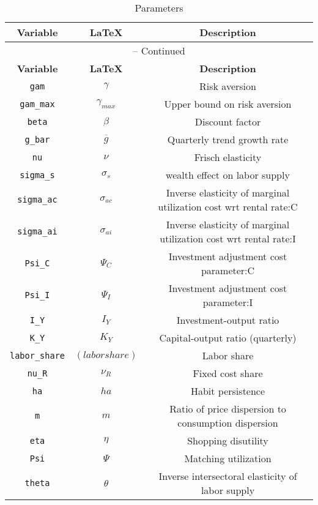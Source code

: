 \begin{center}
\begin{longtable}{ccc}
\caption{Parameters}\\%
\hline%
\multicolumn{1}{c}{\textbf{Variable}} &
\multicolumn{1}{c}{\textbf{\LaTeX}} &
\multicolumn{1}{c}{\textbf{Description}}\\%
\hline\hline%
\endfirsthead
\multicolumn{3}{c}{{\tablename} \thetable{} -- Continued}\\%
\hline%
\multicolumn{1}{c}{\textbf{Variable}} &
\multicolumn{1}{c}{\textbf{\LaTeX}} &
\multicolumn{1}{c}{\textbf{Description}}\\%
\hline\hline%
\endhead
\texttt{gam} & ${\gamma}$ & Risk aversion\\
\texttt{gam\_max} & ${\gamma_{max}}$ & Upper bound on risk aversion\\
\texttt{beta} & ${\beta}$ & Discount factor\\
\texttt{g\_bar} & ${\overline{g}}$ & Quarterly trend growth rate\\
\texttt{nu} & $\nu$ & Frisch elasticity\\
\texttt{sigma\_s} & $\sigma_s$ & wealth effect on labor supply\\
\texttt{sigma\_ac} & ${\sigma_{ac}}$ & Inverse elasticity of marginal utilization cost wrt rental rate:C\\
\texttt{sigma\_ai} & ${\sigma_{ai}}$ & Inverse elasticity of marginal utilization cost wrt rental rate:I\\
\texttt{Psi\_C} & ${\Psi_C}$ & Investment adjustment cost parameter:C\\
\texttt{Psi\_I} & ${\Psi_I}$ & Investment adjustment cost parameter:I\\
\texttt{I\_Y} & ${I_Y}$ & Investment-output ratio\\
\texttt{K\_Y} & ${K_Y}$ & Capital-output ratio (quarterly)\\
\texttt{labor\_share} & $(labor share)$ & Labor share\\
\texttt{nu\_R} & ${\nu_R}$ & Fixed cost share\\
\texttt{ha} & ${ha}$ & Habit persistence\\
\texttt{m} & ${m}$ & Ratio of price dispersion to consumption dispersion\\
\texttt{eta} & ${\eta}$ & Shopping disutility\\
\texttt{Psi} & ${\Psi}$ & Matching utilization\\
\texttt{theta} & ${\theta}$ & Inverse intersectoral elasticity of labor supply\\

\end{longtable}
\end{center}
